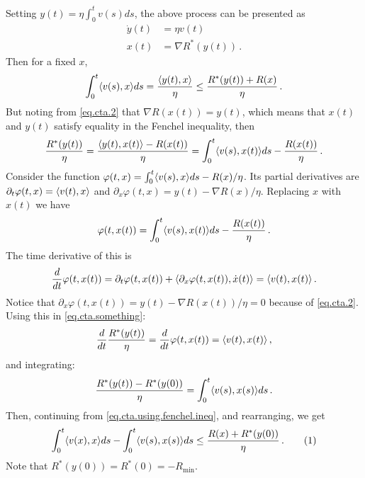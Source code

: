 \documentclass[12pt]{article}
\theoremstyle{plain}
\theoremstyle{definition}
\theoremstyle{remark}
\begin{document}
\medskip

Setting $y(t) = \eta \int_{0}^{t} v(s) ds$, the above process can be presented as
\begin{align*}
\dot{y}(t) &= \eta v(t) \label{eq.cta.1} \tag{1ct'} \\
x(t) &= \nabla R^{*}(y(t))\,. \label{eq.cta.2} \tag{2ct'}
\end{align*}
Then for a fixed $x$,
\begin{equation}
\int_{0}^{t} \langle {v(s), x}\rangle ds
= \frac{\langle {y(t), x}\rangle}{\eta}
\leq \frac{R^{*}(y(t)) + R(x)}{\eta}\,.
\label{eq.cta.using.fenchel.ineq}
\end{equation}
But noting from \eqref{eq.cta.2} that $\nabla R (x(t)) = y(t)$, 
which means that $x(t)$ and $y(t)$ satisfy equality in the Fenchel inequality,
then
\begin{align}
\frac{R^{*}(y(t))}{\eta}
= \frac{\langle {y(t), x(t)}\rangle - R(x(t))}{\eta} 
= \int_{0}^{t} \langle {v(s), x(t)}\rangle ds - \frac{R(x(t))}{\eta}\,.
\label{eq.cta.something}
\end{align}
Consider the function $\varphi(t,x) = \int_{0}^{t} \langle {v(s), x}\rangle ds - R(x)/\eta$.
Its partial derivatives are $\partial_{t} \varphi(t,x) = \langle {v(t),x}\rangle$ and
$\partial_{x} \varphi(t,x) = y(t) - \nabla R(x)/\eta$.
Replacing $x$ with $x(t)$ we have 
$$
\varphi(t,x(t)) = \int_{0}^{t} \langle {v(s), x(t)}\rangle ds - \frac{R(x(t))}{\eta}\,.
$$
The time derivative of this is
\begin{align*}
\frac{d}{dt}\varphi(t,x(t))
= \partial_{t}\varphi(t,x(t)) + \langle {\partial_{x} \varphi(t,x(t)), \dot{x}(t)}\rangle
= \langle {v(t), x(t)}\rangle\,.
\end{align*}
Notice that $\partial_{x} \varphi(t,x(t)) = y(t) - \nabla R(x(t))/\eta = 0$ because of \eqref{eq.cta.2}.
Using this in \eqref{eq.cta.something}:
\begin{align*}
\frac{d}{dt} \frac{R^{*}(y(t))}{\eta}
= \frac{d}{dt}\varphi(t,x(t))
= \langle {v(t), x(t)}\rangle\,,
\end{align*}
and integrating:
\begin{align*}
\frac{R^{*}(y(t)) - R^{*}(y(0))}{\eta}
= \int_{0}^{t} \langle {v(s), x(s)}\rangle ds\,.
\end{align*}
Then, continuing from \eqref{eq.cta.using.fenchel.ineq},
and rearranging, we get
\begin{align*}
\int_{0}^{t} \ab{v(x), x} ds - \int_{0}^{t} \ab{v(s), x(s)} ds 
\leq \frac{R(x) + R^{*}(y(0))}{\eta}\,.
\addtocounter{equation}{1}
\label{eq.cta.bound.shaping}  \tag{\theequation}
\end{align*}
Note that $R^{*}(y(0)) = R^{*}(0) = - R_{\text{min}}$. 
\end{document}
